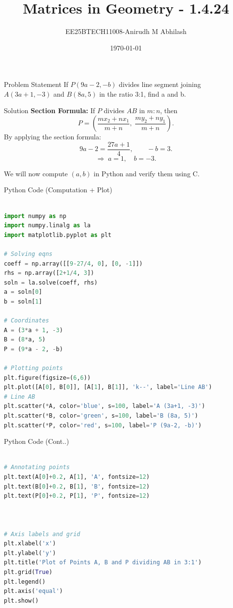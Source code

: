 \documentclass{beamer}
\title{Matrices in Geometry - 1.4.24}
\author{EE25BTECH11008-Anirudh M Abhilash}
\date{\today}
\begin{document}
\begin{frame}
\titlepage
\end{frame}

\begin{frame}{Problem Statement}
If $P(9a-2, -b)$ divides line segment joining $A(3a+1, -3)$ and $B(8a, 5)$ in the ratio 3:1, find a and b.

\end{frame}

\begin{frame}{Solution}
\textbf{Section Formula:}  
If $P$ divides $AB$ in $m:n$, then
\[
P = \left(\frac{mx_2 + nx_1}{m+n}, \; \frac{my_2 + ny_1}{m+n}\right).
\]
By applying the section formula:
\[
9a - 2 = \frac{27a+1}{4}, \qquad -b = 3.
\]
\[
\Rightarrow \; a = 1, \quad b = -3.
\]

We will now compute $(a,b)$ in Python and verify them using C.
\end{frame}

\begin{frame}[fragile]{Python Code (Computation + Plot)}
\begin{lstlisting}[language=Python, basicstyle=\ttfamily\scriptsize]

import numpy as np
import numpy.linalg as la
import matplotlib.pyplot as plt

# Solving eqns
coeff = np.array([[9-27/4, 0], [0, -1]])
rhs = np.array([2+1/4, 3])
soln = la.solve(coeff, rhs)
a = soln[0]
b = soln[1]

# Coordinates
A = (3*a + 1, -3)
B = (8*a, 5)
P = (9*a - 2, -b)

# Plotting points
plt.figure(figsize=(6,6))
plt.plot([A[0], B[0]], [A[1], B[1]], 'k--', label='Line AB')  
# Line AB
plt.scatter(*A, color='blue', s=100, label='A (3a+1, -3)')
plt.scatter(*B, color='green', s=100, label='B (8a, 5)')
plt.scatter(*P, color='red', s=100, label='P (9a-2, -b)')

\end{lstlisting}
\end{frame}

\begin{frame}[fragile]{Python Code (Cont..)}
\begin{lstlisting}[language=Python, basicstyle=\ttfamily\scriptsize]

# Annotating points
plt.text(A[0]+0.2, A[1], 'A', fontsize=12)
plt.text(B[0]+0.2, B[1], 'B', fontsize=12)
plt.text(P[0]+0.2, P[1], 'P', fontsize=12)



# Axis labels and grid
plt.xlabel('x')
plt.ylabel('y')
plt.title('Plot of Points A, B and P dividing AB in 3:1')
plt.grid(True)
plt.legend()
plt.axis('equal')
plt.show()
\end{lstlisting}
\end{frame}
\end{document}
